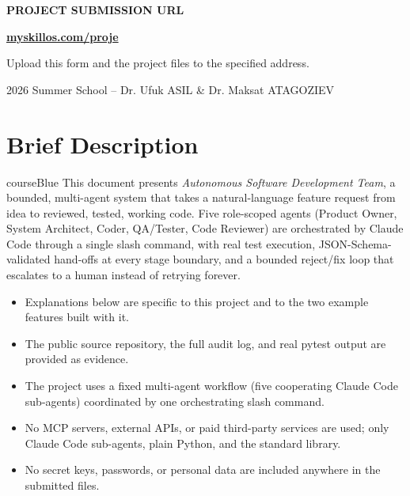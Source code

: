 \documentclass[11pt,a4paper]{article}
\begin{document}
\begin{titlepage}
  \vfill
  \begin{center}
    \begin{tcolorbox}[width=0.88\linewidth,colback=courseBlue!6,colframe=courseBlue,
      arc=2mm,left=2mm,right=2mm,top=1mm,bottom=1mm]
      \centering
      {\normalsize\bfseries PROJECT SUBMISSION URL}\par
      {\Large\bfseries\href{https://myskillos.com/proje}{myskillos.com/proje}}\par
      \footnotesize Upload this form and the project files to the specified address.
    \end{tcolorbox}
    {\footnotesize 2026 Summer School -- Dr. Ufuk ASIL \& Dr. Maksat ATAGOZIEV}
  \end{center}
\end{titlepage}


\section*{Brief Description}

\begin{projectbox}{courseBlue}
This document presents \emph{Autonomous Software Development Team}, a bounded, multi-agent
system that takes a natural-language feature request from idea to reviewed, tested, working
code. Five role-scoped agents (Product Owner, System Architect, Coder, QA/Tester, Code
Reviewer) are orchestrated by Claude Code through a single slash command, with real test
execution, JSON-Schema-validated hand-offs at every stage boundary, and a bounded
reject/fix loop that escalates to a human instead of retrying forever.
\end{projectbox}

\begin{itemize}
  \item Explanations below are specific to this project and to the two example features built with it.
  \item The public source repository, the full audit log, and real pytest output are provided as evidence.
  \item The project uses a fixed multi-agent workflow (five cooperating Claude Code sub-agents) coordinated by one orchestrating slash command.
  \item No MCP servers, external APIs, or paid third-party services are used; only Claude Code sub-agents, plain Python, and the standard library.
  \item No secret keys, passwords, or personal data are included anywhere in the submitted files.
\end{itemize}
\end{document}
